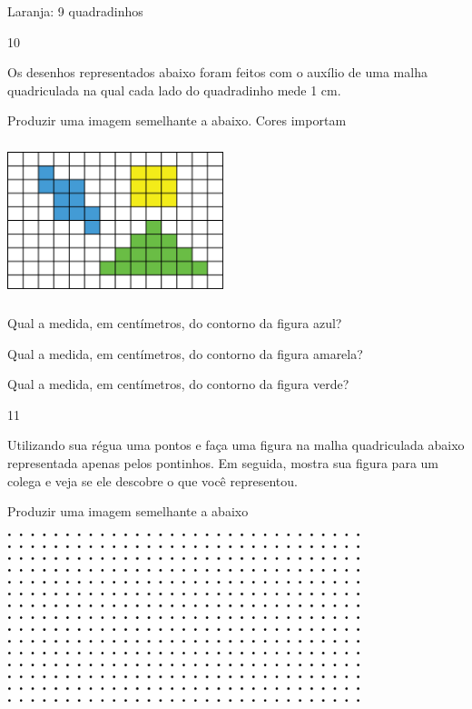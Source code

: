 Laranja: 9 quadradinhos

\num{10}

Os desenhos representados abaixo foram feitos com o auxílio de uma malha
quadriculada na qual cada lado do quadradinho mede 1 cm.

Produzir uma imagem semelhante a abaixo. Cores importam

\includegraphics[width=2.47521in,height=1.77515in]{media/image57.png}

\begin{escolha}

\item
  Qual a medida, em centímetros, do contorno da figura azul?
\coment{18 cm}

\item
  Qual a medida, em centímetros, do contorno da figura amarela?
\coment{12 cm}

\item
  Qual a medida, em centímetros, do contorno da figura verde?
\coment{22 cm}

\end{escolha}

\num{11}

Utilizando sua régua uma pontos e faça uma figura na malha quadriculada
abaixo representada apenas pelos pontinhos. Em seguida, mostra sua
figura para um colega e veja se ele descobre o que você representou.

Produzir uma imagem semelhante a abaixo

\includegraphics[width=4.05869in,height=1.93350in]{media/image58.png}

